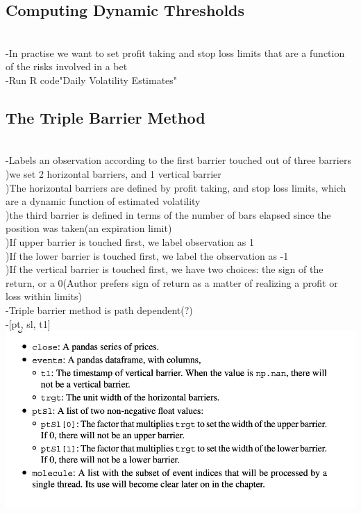 \documentclass{article}
\begin{document}
\subsection{Computing Dynamic Thresholds}\\ 
-In practise we want to set profit taking and stop loss limits that are a function of the risks involved in a bet\\ 
-Run R code"Daily Volatility Estimates"\\ 

\subsection{The Triple Barrier Method}\\ 
-Labels an observation according to the first barrier touched out of three barriers\\ 
		)we set 2 horizontal barriers, and 1 vertical barrier\\ 
    	)The horizontal barriers are defined by profit taking, and stop loss  	  				limits, which are a dynamic function of estimated volatility\\ 
        )the third barrier is defined in terms of the number of bars elapsed since 		the position was taken(an expiration limit)\\ 
        )If upper barrier is touched first, we label observation as 1\\ 
        )If the lower barrier is touched first, we label the observation as -1\\ 
        )If the vertical barrier is touched first, we have two choices: the sign of 
        the return, or a 0(Author prefers sign of return as a matter of realizing a 		profit or loss within limits)\\ 
-Triple barrier method is path dependent(?)\\ 
-[pt, sl, t1]\\ 
\includegraphics[width=\textwidth]{abv.png}\\ 
\end{document}
